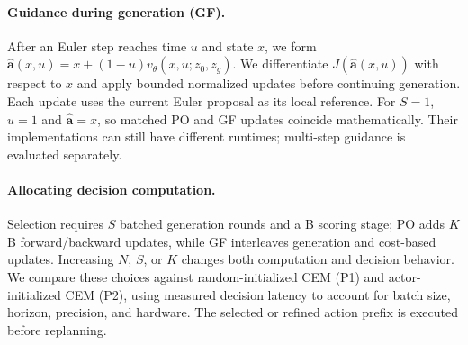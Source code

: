 \paragraph{Guidance during generation (GF).}
After an Euler step reaches time $u$ and state $x$, we form $\hat{\mathbf a}(x,u)=x+(1-u)v_\theta(x,u;z_0,z_g)$. We differentiate $J(\hat{\mathbf a}(x,u))$ with respect to $x$ and apply bounded normalized updates before continuing generation. Each update uses the current Euler proposal as its local reference. For $S=1$, $u=1$ and $\hat{\mathbf a}=x$, so matched PO and GF updates coincide mathematically. Their implementations can still have different runtimes; multi-step guidance is evaluated separately.

\paragraph{Allocating decision computation.}
Selection requires $S$ batched generation rounds and a B scoring stage; PO adds $K$ B forward/backward updates, while GF interleaves generation and cost-based updates. Increasing $N$, $S$, or $K$ changes both computation and decision behavior. We compare these choices against random-initialized CEM (P1) and actor-initialized CEM (P2), using measured decision latency to account for batch size, horizon, precision, and hardware. The selected or refined action prefix is executed before replanning.
